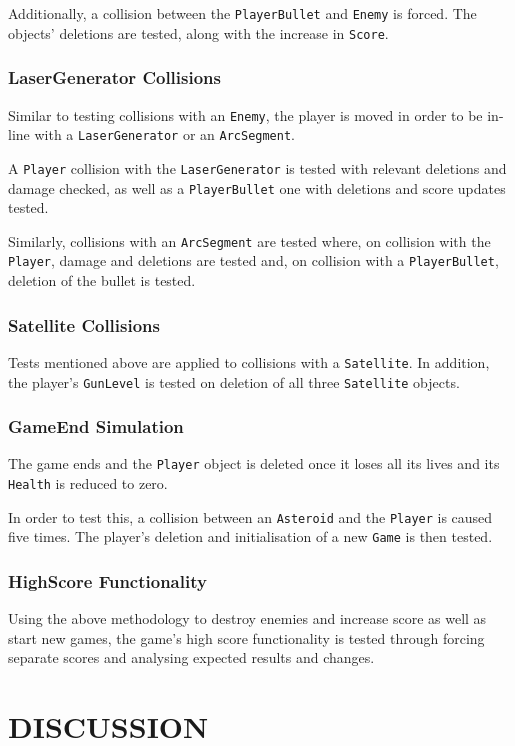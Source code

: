 \documentclass[10pt,twocolumn]{witseiepaper}
\begin{document}
Additionally, a collision between the \texttt{PlayerBullet} and \texttt{Enemy} is forced. The objects' deletions are tested, along with the increase in \texttt{Score}.
\subsubsection{LaserGenerator Collisions}
Similar to testing collisions with an \texttt{Enemy}, the player is moved in order to be in-line with a \texttt{LaserGenerator} or an \texttt{ArcSegment}. 

A \texttt{Player} collision with the \texttt{LaserGenerator} is tested with relevant deletions and damage checked, as well as a \texttt{PlayerBullet} one with deletions and score updates tested. 

Similarly, collisions with an \texttt{ArcSegment} are tested where, on collision with the \texttt{Player}, damage and deletions are tested and, on collision with a \texttt{PlayerBullet}, deletion of the bullet is tested.
\subsubsection{Satellite Collisions}
Tests mentioned above are applied to collisions with a \texttt{Satellite}. In addition, the player's \texttt{GunLevel} is tested on deletion of all three \texttt{Satellite} objects.
\subsubsection{GameEnd Simulation}
The game ends and the \texttt{Player} object is deleted once it loses all its lives and its \texttt{Health} is reduced to zero.

In order to test this, a collision between an \texttt{Asteroid} and the \texttt{Player} is caused five times. The player's deletion and initialisation of a new \texttt{Game} is then tested.
\subsubsection{HighScore Functionality}
Using the above methodology to destroy enemies and increase score as well as start new games, the game's high score functionality is tested through forcing separate scores and analysing expected results and changes. 
\section{DISCUSSION}
\end{document}
